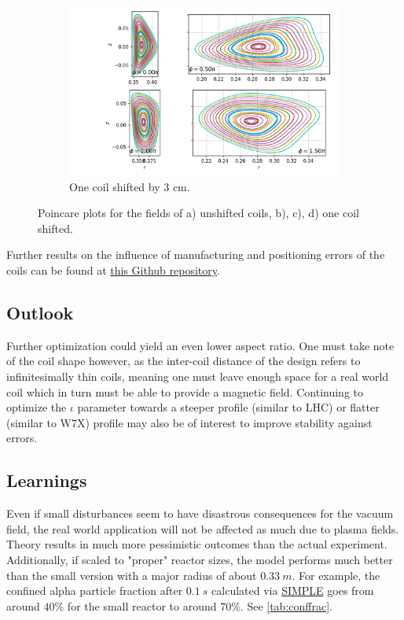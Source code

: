 \begin{figure}[H]
\captionsetup[subfigure]{justification=centering}
\ContinuedFloat
\begin{subfigure}{1.0\textwidth}
\centering
\includegraphics[scale=0.7]{Images/03_Design/3cm.png}
\caption{One coil shifted by 3 cm.}
\label{fig:3cm_shifted}
\end{subfigure}

\caption{Poincare plots for the fields of a) unshifted coils, b), c), d) one coil shifted.}
\label{fig:poincare_shifted_coils}
\end{figure}

Further results on the influence of manufacturing and positioning errors of the coils can be found at \href{https://github.com/itpplasma/reactor24}{this Github repository}\cite{design_repo}.

\subsection{Outlook}
Further optimization could yield an even lower aspect ratio.
One must take note of the coil shape however, as the inter-coil distance of the design refers to infinitesimally thin coils, meaning one must leave enough space for a real world coil which in turn must be able to provide a magnetic field.
Continuing to optimize the $\iota$ parameter towards a steeper profile (similar to LHC) or flatter (similar to W7X) profile may also be of interest to improve stability against errors.

\subsection{Learnings}
Even if small disturbances seem to have disastrous consequences for the vacuum field, the real world application will not be affected as much due to plasma fields. Theory results in much more pessimistic outcomes than the actual experiment.\\
Additionally, if scaled to "proper" reactor sizes, the model performs much better than the small version with a major radius of about $0.33~\unit{m}$. For example, the confined alpha particle fraction after $0.1~\unit{s}$ calculated via \href{https://github.com/itpplasma/SIMPLE}{SIMPLE} goes from around $40\%$ for the small reactor to around $70\%$. See \autoref{tab:conffrac}.
